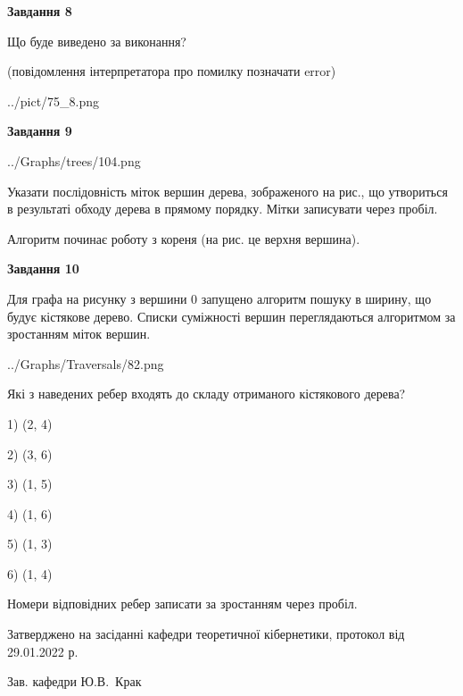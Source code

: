 \documentclass[12pt, ukrainian]{article}
\begin{document}
{\begin {large}
{\begin {center}\textbf{Завдання 8}\end {center}}\par
Що буде виведено за виконання?\par
 (повідомлення інтерпретатора про помилку позначати error)\par
\begin{center}
	{../pict/75_8.png}
\end{center}
\newpage

{\begin {center}\textbf{Завдання 9}\end {center}}\par

\begin{center}
	{../Graphs/trees/104.png}
\end{center}
Указати послідовність міток вершин дерева, зображеного на рис., що утвориться в результаті обходу дерева в прямому порядку. Мітки записувати через пробіл.\par Алгоритм починає роботу з кореня (на рис. це верхня вершина).\par
\newpage

{\begin {center}\textbf{Завдання 10}\end {center}}\par
Для графа на рисунку з вершини 0 запущено алгоритм пошуку в ширину, що будує кістякове дерево. Списки суміжності вершин переглядаються алгоритмом за зростанням міток вершин.\par
\begin{center}
	{../Graphs/Traversals/82.png}
\end{center}
\par Які з наведених ребер входять до складу отриманого кістякового дерева?\par
1) (2, 4)\par
2) (3, 6)\par
3) (1, 5)\par
4) (1, 6)\par
5) (1, 3)\par
6) (1, 4)\par
{\vskip 15pt} Номери відповідних ребер записати за зростанням через пробіл.\par
\newpage


\end {large}
}
{\smallskip \begin {small} Затверджено на засіданні кафедри теоретичної кібернетики, протокол  від   29.01.2022 р.\par\smallskip\smallskip
{\parbox {6.5 cm}{Зав. кафедри \dotfill Ю.В.~Крак}} \end{small}}
\end{document}

